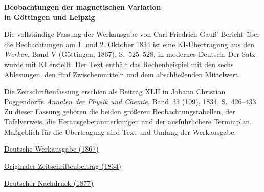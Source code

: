 \clearpage
\thispagestyle{empty}
\begin{center}\Large\textbf{Beobachtungen der magnetischen Variation\\in Göttingen und Leipzig}\end{center}

Die vollständige Fassung der Werkausgabe von Carl Friedrich Gauß’ Bericht über die Beobachtungen am 1. und 2. Oktober 1834 ist eine KI-Übertragung aus den \textit{Werken}, Band V (Göttingen, 1867), S.~525--528, in modernes Deutsch. Der Satz wurde mit KI erstellt. Der Text enthält das Rechenbeispiel mit den sechs Ablesungen, den fünf Zwischenmitteln und dem abschließenden Mittelwert.

Die Zeitschriftenfassung erschien als Beitrag XLII in Johann Christian Poggendorffs \textit{Annalen der Physik und Chemie}, Band~33 (109), 1834, S.~426--433. Zu dieser Fassung gehören die beiden größeren Beobachtungstabellen, der Tafelverweis, die Herausgeberanmerkungen und der ausführlichere Terminplan. Maßgeblich für die Übertragung sind Text und Umfang der Werkausgabe.

\medskip\noindent
\href{https://gdz.sub.uni-goettingen.de/id/PPN236006339}{Deutsche Werkausgabe (1867)}\par
\noindent\href{https://www.digitale-sammlungen.de/view/bsb10130346?page=440}{Originaler Zeitschriftenbeitrag (1834)}\par
\noindent\href{https://doi.org/10.1007/978-3-642-49319-5_29}{Deutscher Nachdruck (1877)}
\clearpage
